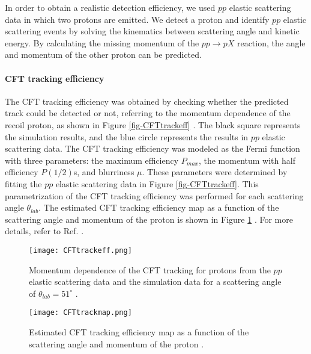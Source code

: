 In order to obtain a realistic detection efficiency, we used $pp$ elastic scattering data in which two protons are emitted. We detect a proton and identify $pp$ elastic scattering events by solving the kinematics between scattering angle and kinetic energy. By calculating the missing momentum of the $pp\rightarrow pX$ reaction, the angle and momentum of the other proton can be predicted.

\vspace{10pt}
\paragraph{CFT tracking efficiency}
The CFT tracking efficiency was obtained by checking whether the predicted track could be detected or not, referring to the momentum dependence of the recoil proton, as shown in Figure \ref{fig-CFTtrackeff} \cite{Miwa-SMp}. The black square represents the simulation results, and the blue circle represents the results in $pp$ elastic scattering data. The CFT tracking efficiency was modeled as the Fermi function with three parameters: the maximum efficiency $P_{max}$, the momentum with half efficiency $P(1/2)$s, and blurriness $\mu$. These parameters were determined by fitting the $pp$ elastic scattering data in Figure \ref{fig-CFTtrackeff}. This parametrization of the CFT tracking efficiency was performed for each scattering angle $\theta_{lab}$. The estimated CFT tracking efficiency map as a function of the scattering angle and momentum of the proton is shown in Figure \ref{fig-CFTtrackmap} \cite{Miwa-SMp}. For more details, refer to Ref. \cite{Miwa-SMp}.

\begin{figure}[!h]
  \begin{minipage}[t]{0.48\columnwidth}
    \centering
    \texttt{[image: CFTtrackeff.png]}
    \caption{Momentum dependence of the CFT tracking for protons from the $pp$ elastic scattering data and the simulation data for a scattering angle of $\theta_{lab}=51^{\circ}$ \cite{Miwa-SMp}.}
    \label{fig-CFTtrackeff}
  \end{minipage}
  \hspace{0.04\columnwidth} %
  \begin{minipage}[t]{0.48\columnwidth}
    \centering
    \texttt{[image: CFTtrackmap.png]}
    \caption{Estimated CFT tracking efficiency map as a function of the scattering angle and momentum of the proton \cite{Miwa-SMp}.}
    \label{fig-CFTtrackmap}
  \end{minipage}
\end{figure}

